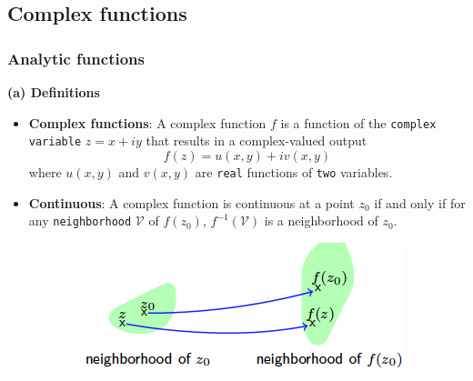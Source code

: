 \subsection{Complex functions}

\subsubsection{Analytic functions}
\textbf{(a) Definitions}

\begin{itemize}
	\item \textbf{Complex functions}: A complex function $f$ is a function of the \verb|complex variable| $z=x+iy$ that results in a complex-valued output
	$$
	f(z) = u(x,y) + iv(x,y)
	$$
	where $u(x,y)$ and $v(x,y) $ are \verb|real| functions of \verb|two| variables.
	\item \textbf{Continuous}: A complex function is continuous at a point $z_0$ if and only if for any \verb|neighborhood| $\mathcal{V}$ of $f(z_0)$, $f^{-1}(\mathcal{V})$ is a neighborhood of $z_0$. 
	\begin{figure}
	\includegraphics{figures/screenshot/screenshot.png}
	\end{figure}
\end{itemize}